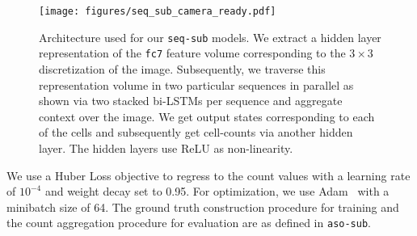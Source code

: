 \documentclass[10pt,twocolumn,letterpaper]{article}
\newcommand{\sub}{\texttt{aso-sub}\xspace}
\newcommand{\seq}{\texttt{seq-sub}\xspace}
\begin{document}
\begin{figure}
\texttt{[image: figures/seq\_sub\_camera\_ready.pdf]}
\vspace{-25pt}
\caption{\footnotesize{Architecture used for our \seq{} models. We extract a hidden layer representation of the \texttt{fc7} feature volume corresponding to the $3\times3$ discretization of the image. Subsequently, we traverse this representation volume in two particular sequences in parallel as shown via two stacked bi-LSTMs per sequence and aggregate context over the image. We get output states corresponding to each of the cells and subsequently get cell-counts via another hidden layer. The hidden layers use ReLU as non-linearity.}}
\label{fig:seqsub}
\vspace{-17pt}
\end{figure}







We use a Huber Loss objective to regress to the count values with a learning rate of $10^{-4}$ and weight decay set to 0.95. For optimization, we use Adam~\cite{KingmaB14} with a minibatch size of 64. The ground truth construction procedure for training and the count aggregation procedure for evaluation are as defined in \sub.







\begin{comment}
\subsection{Counting by Glancing}
\begin{itemize}
\item Train a Neural network and an SVR to regress to counts
\item Take fc7 features, add a single hidden layer and no-hidden layers to get counts
\item Given an image network produces a $n$ dimensional vector indicating counts for various categories
\item Trained with batch-normalization
\item Used an RBF kernel SVR on the fc7 features to regress to counts
\item found that both the SVR and NN performed nearly same, but NN was much faster to train
\item Thus use NN for the rest of the experiments in the paper
\end{itemize}
\end{comment}
\end{document}
